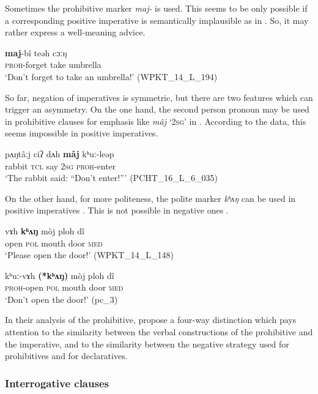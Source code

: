 \documentclass[output=paper,colorlinks,citecolor=brown]{langscibook}
\begin{document}
Sometimes the prohibitive marker \textit{maj{}-} is used. This seems to be only possible if a corresponding positive imperative is semantically implausible as in . So, it may rather express a well-meaning advice.

\ea\label{ex:rum:23}
    \gll \textbf{maj}-bî	teəh	cɔːŋ \\
         \textsc{proh}{}-forget take umbrella \\
    \glt ‘Don’t forget to take an umbrella!’ (WPKT\_14\_L\_194)
\z 

So far, negation of imperatives is symmetric, but there are two features which can trigger an asymmetry. On the one hand, the second person pronoun may be used in prohibitive clauses for emphasis like \textit{mâj} ‘2\textsc{sg}’ in . According to the data, this seems impossible in positive imperatives.

\ea\label{ex:rum:24}
    \gll pʌŋtâːj	ciʔ	dʌh	\textbf{mâj}	kʰuː-leəp \\
         rabbit \textsc{tcl} say 2\textsc{sg} \textsc{proh}{}-enter \\
    \glt ‘The rabbit said: “Don’t enter!”’ (PCHT\_16\_L\_6\_035)
\z 

On the other hand, for more politeness, the polite marker \textit{kʰʌŋ} can be used in positive imperatives . This is not possible in negative ones .

\ea\label{ex:rum:25}
    \gll vɤh	\textbf{kʰʌŋ}	mòj	ploh	dî \\
         open \textsc{pol} mouth door \textsc{med} \\
    \glt  ‘Please open the door!’ (WPKT\_14\_L\_148)
\z 

\ea\label{ex:rum:26}
    \gll kʰuː-vɤh	\textbf{(*kʰʌŋ)}	mòj	ploh	dî\\
         \textsc{proh}{}-open \textsc{pol} mouth door \textsc{med}\\
    \glt ‘Don’t open the door!’ (pc\_3)
\z 

In their analysis of the prohibitive, \citet{AuweraEtAl2013-wals70} propose a four-way distinction which pays attention to the similarity between the verbal constructions of the prohibitive and the imperative, and to the similarity between the negative strategy used for prohibitives and for declaratives. 

\subsubsection{Interrogative clauses} \label{sec:rum:2.2.2}
\end{document}

